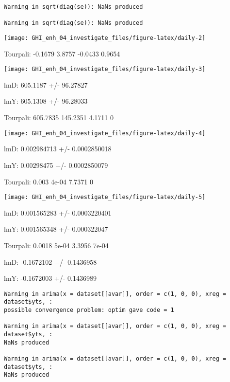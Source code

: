 \documentclass[
  10pt,
  a4paper,oneside]{article}
\begin{document}
\begin{verbatim}
Warning in sqrt(diag(se)): NaNs produced

Warning in sqrt(diag(se)): NaNs produced
\end{verbatim}

\begin{center}\texttt{[image: GHI\_enh\_04\_investigate\_files/figure-latex/daily-2]} \end{center}

Tourpali: -0.1679 3.8757 -0.0433 0.9654

\begin{center}\texttt{[image: GHI\_enh\_04\_investigate\_files/figure-latex/daily-3]} \end{center}

lmD: 605.1187 +/- 96.27827

lmY: 605.1308 +/- 96.28033

Tourpali: 605.7835 145.2351 4.1711 0

\begin{center}\texttt{[image: GHI\_enh\_04\_investigate\_files/figure-latex/daily-4]} \end{center}

lmD: 0.002984713 +/- 0.0002850018

lmY: 0.00298475 +/- 0.0002850079

Tourpali: 0.003 4e-04 7.7371 0

\begin{center}\texttt{[image: GHI\_enh\_04\_investigate\_files/figure-latex/daily-5]} \end{center}

lmD: 0.001565283 +/- 0.0003220401

lmY: 0.001565348 +/- 0.000322047

Tourpali: 0.0018 5e-04 3.3956 7e-04

lmD: -0.1672102 +/- 0.1436958

lmY: -0.1672003 +/- 0.1436989

\begin{verbatim}
Warning in arima(x = dataset[[avar]], order = c(1, 0, 0), xreg = dataset$yts, :
possible convergence problem: optim gave code = 1

Warning in arima(x = dataset[[avar]], order = c(1, 0, 0), xreg = dataset$yts, :
NaNs produced

Warning in arima(x = dataset[[avar]], order = c(1, 0, 0), xreg = dataset$yts, :
NaNs produced
\end{verbatim}
\end{document}
